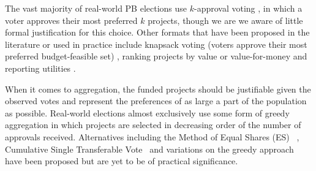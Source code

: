 \documentclass[letterpaper]{article} %
\newcommand{\mes}{ES}
\begin{document}


The vast majority of real-world PB elections use $k$-approval voting \cite{aziz2021participatory}, in which a voter approves their most preferred $k$ projects, though we are we aware of little formal justification for this choice.  Other formats that have been proposed in the literature or used in practice include knapsack voting (voters approve their most preferred budget-feasible set)  \cite{goel2019knapsack}, ranking projects by value or value-for-money  \cite{aziz2020expanding, benade2021preference} and reporting utilities \cite{peters2021proportional}. 



When it comes to aggregation,  the funded projects should be justifiable given the observed votes and represent the preferences of  as large a part of the population as possible. 
Real-world elections almost exclusively use some form of greedy aggregation in which projects are selected in decreasing order of the number of approvals   received.  Alternatives including the Method of Equal Shares (\mes{})~\citep{peters2021proportional} , Cumulative Single Transferable Vote~\citep{skowron2020participatory} and variations on the greedy approach~\citep{talmon2019framework} have been proposed %
but are yet to be of practical significance.
\end{document}
